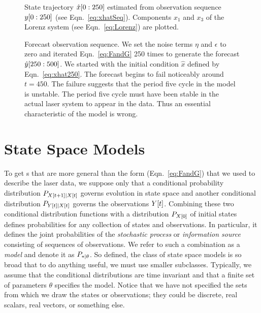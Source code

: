 \begin{figure}[htbp]
  \caption[State trajectory $\ts{\hat x}{0}{250}$.]%
  {State trajectory $\ts{\hat x}{0}{250}$ estimated from
    observation sequence $y[0:250]$ (see
    Eqn.~\eqref{eq:xhatSeq}).  Components $x_1$ and $x_3$ of the
    Lorenz system (see Eqn.~\eqref{eq:Lorenz}) are plotted.}
  \label{fig:LaserStates}
\end{figure}

\begin{figure}[htbp]
  \caption[Forecast observation
  sequence.]%
  {Forecast observation sequence.  We set the noise terms $\eta$ and
    $\epsilon$ to zero and iterated Eqn.~\eqref{eq:FandG} 250 times to
    generate the forecast $\hat y[250:500]$.  We started with
    the initial condition $\hat x$ defined by Eqn.~\eqref{eq:xhat250}.
    The forecast begins to fail noticeably around $t=450$.  The failure
    suggests that the period five cycle in the model is unstable.  The
    period five cycle must have been stable in the actual laser system
    to appear in the data.  Thus an essential characteristic of the
    model is wrong.}
  \label{fig:LaserForecast}
\end{figure}


\section{State Space Models}
\label{sec:formal_ssm}

To get s that are more general than the form
(Eqn.~\eqref{eq:FandG}) that we used to describe the laser data, we
suppose only that a conditional probability distribution
$P_{{X}{[t+1]}\mid {X}{[t]}}$ governs evolution in state space and
another conditional distribution $P_{{Y}{[t]}\mid {X}{[t]}}$ governs the
observations ${Y}{[t]}$.  Combining these two conditional
distribution functions with a distribution $P_{{X}{[0]}}$ of initial
states defines probabilities for any collection of states and
observations.  In particular, it defines the joint probabilities of
the \emph{stochastic process} or \emph{information source} consisting
of sequences of observations.  We refer to such a combination as a
\emph{model} and denote it as $P_{*\mid \theta}$.  So defined, the class
of state space models is so broad that to do anything useful, we must
use smaller subclasses.  Typically, we assume that the conditional
distributions are time invariant and that a finite set of parameters
$\theta$ specifies the model.  Notice that we have not specified the
sets from which we draw the states or observations; they could be
discrete, real scalars, real vectors, or something else.


